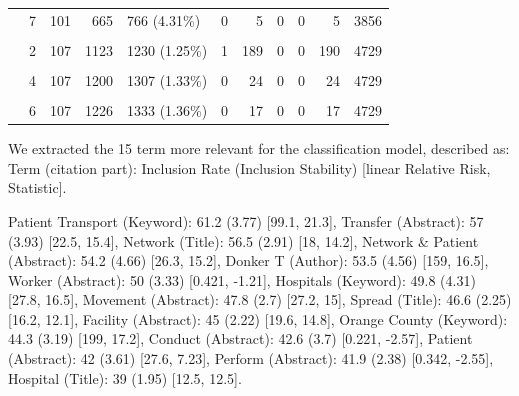 \documentclass{article}
\begin{document}
\begin{table}[!h]
{\begin{tabular}[t]{llrrlrrrrrr}
 & 7 & 101 & 665 & 766 (4.31\%) & 0 & 5 & 0 & 0 & 5 & 3856\\
\cellcolor{gray!6}{Session2 (n = 98371)} & \cellcolor{gray!6}{1} & \cellcolor{gray!6}{106} & \cellcolor{gray!6}{934} & \cellcolor{gray!6}{1040 (1.06\%)} & \cellcolor{gray!6}{5} & \cellcolor{gray!6}{270} & \cellcolor{gray!6}{998} & \cellcolor{gray!6}{0} & \cellcolor{gray!6}{1273} & \cellcolor{gray!6}{4729}\\
 & 2 & 107 & 1123 & 1230 (1.25\%) & 1 & 189 & 0 & 0 & 190 & 4729\\
\addlinespace
\cellcolor{gray!6}{} & \cellcolor{gray!6}{3} & \cellcolor{gray!6}{107} & \cellcolor{gray!6}{1176} & \cellcolor{gray!6}{1283 (1.3\%)} & \cellcolor{gray!6}{0} & \cellcolor{gray!6}{53} & \cellcolor{gray!6}{0} & \cellcolor{gray!6}{0} & \cellcolor{gray!6}{53} & \cellcolor{gray!6}{4733}\\
 & 4 & 107 & 1200 & 1307 (1.33\%) & 0 & 24 & 0 & 0 & 24 & 4729\\
\cellcolor{gray!6}{} & \cellcolor{gray!6}{5} & \cellcolor{gray!6}{107} & \cellcolor{gray!6}{1209} & \cellcolor{gray!6}{1316 (1.34\%)} & \cellcolor{gray!6}{0} & \cellcolor{gray!6}{9} & \cellcolor{gray!6}{0} & \cellcolor{gray!6}{0} & \cellcolor{gray!6}{9} & \cellcolor{gray!6}{4729}\\
 & 6 & 107 & 1226 & 1333 (1.36\%) & 0 & 17 & 0 & 0 & 17 & 4729\\
\bottomrule
\end{tabular}}
\end{table}

We extracted the 15 term more relevant for the classification model,
described as: Term (citation part): Inclusion Rate (Inclusion Stability)
{[}linear Relative Risk, Statistic{]}.

Patient Transport (Keyword): 61.2 (3.77) {[}99.1, 21.3{]}, Transfer
(Abstract): 57 (3.93) {[}22.5, 15.4{]}, Network (Title): 56.5 (2.91)
{[}18, 14.2{]}, Network \& Patient (Abstract): 54.2 (4.66) {[}26.3,
15.2{]}, Donker T (Author): 53.5 (4.56) {[}159, 16.5{]}, Worker
(Abstract): 50 (3.33) {[}0.421, -1.21{]}, Hospitals (Keyword): 49.8
(4.31) {[}27.8, 16.5{]}, Movement (Abstract): 47.8 (2.7) {[}27.2, 15{]},
Spread (Title): 46.6 (2.25) {[}16.2, 12.1{]}, Facility (Abstract): 45
(2.22) {[}19.6, 14.8{]}, Orange County (Keyword): 44.3 (3.19) {[}199,
17.2{]}, Conduct (Abstract): 42.6 (3.7) {[}0.221, -2.57{]}, Patient
(Abstract): 42 (3.61) {[}27.6, 7.23{]}, Perform (Abstract): 41.9 (2.38)
{[}0.342, -2.55{]}, Hospital (Title): 39 (1.95) {[}12.5, 12.5{]}.
\end{document}
